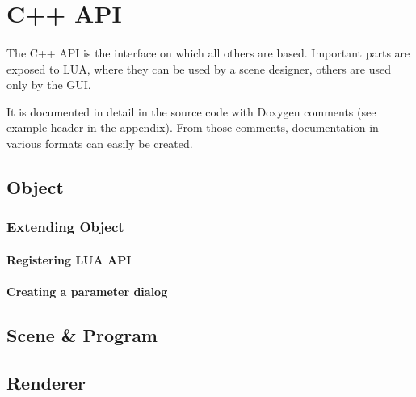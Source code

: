 \section{C++ API}
\paragraph{}
The C++ API is the interface on which all others are based.
Important parts are exposed to LUA, where they can be used by a scene designer, others are used only by the GUI.

It is documented in detail in the source code with Doxygen comments (see example header in the appendix).
From those comments, documentation in various formats can easily be created.

\subsection{Object}
\paragraph{}


\subsubsection{Extending Object}
\paragraph{}


\paragraph{Registering LUA API}


\paragraph{Creating a parameter dialog}


\subsection{Scene \& Program}
\paragraph{}


\subsection{Renderer}
